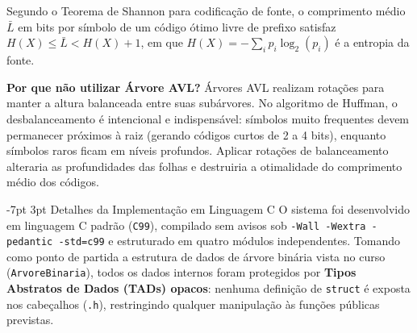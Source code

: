 \documentclass[a4paper,10pt]{article}
\makeatletter
\renewcommand\section{\@startsection {section}{1}{\z@}%
                                   {-7pt \@plus -2pt \@minus -1pt}%
                                   {3pt \@plus 1pt}%
                                   {\normalfont\large\bfseries}}
\makeatother
\begin{document}
Segundo o Teorema de Shannon para codificação de fonte, o comprimento médio $\bar{L}$ em bits por símbolo de um código ótimo livre de prefixo satisfaz $H(X) \le \bar{L} < H(X) + 1$, em que $H(X) = -\sum_i p_i \log_2(p_i)$ é a entropia da fonte.

\textbf{Por que não utilizar Árvore AVL?} Árvores AVL realizam rotações para manter a altura balanceada entre suas subárvores. No algoritmo de Huffman, o desbalanceamento é intencional e indispensável: símbolos muito frequentes devem permanecer próximos à raiz (gerando códigos curtos de 2 a 4 bits), enquanto símbolos raros ficam em níveis profundos. Aplicar rotações de balanceamento alteraria as profundidades das folhas e destruiria a otimalidade do comprimento médio dos códigos.

\newpage

\section{Detalhes da Implementação em Linguagem C}
O sistema foi desenvolvido em linguagem C padrão (\texttt{C99}), compilado sem avisos sob \texttt{-Wall -Wextra -pedantic -std=c99} e estruturado em quatro módulos independentes. Tomando como ponto de partida a estrutura de dados de árvore binária vista no curso (\texttt{ArvoreBinaria}), todos os dados internos foram protegidos por \textbf{Tipos Abstratos de Dados (TADs) opacos}: nenhuma definição de \texttt{struct} é exposta nos cabeçalhos (\texttt{.h}), restringindo qualquer manipulação às funções públicas previstas.
\end{document}
